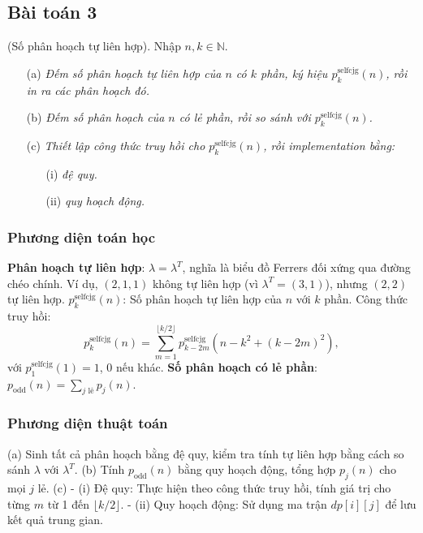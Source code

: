 \documentclass[a4paper,12pt]{article}
\begin{document}
\subsection{Bài toán 3} (Số phân hoạch tự liên hợp). Nhập $n, k \in \mathbb{N}$.
\begin{itemize}
    \item[(a)] \textit{Đếm số phân hoạch tự liên hợp của $n$ có $k$ phần, ký hiệu $p_k^{\text{selfcjg}}(n)$, rồi in ra các phân hoạch đó.}
    \item[(b)] \textit{Đếm số phân hoạch của $n$ có lẻ phần, rồi so sánh với $p_k^{\text{selfcjg}}(n)$.}
    \item[(c)] \textit{Thiết lập công thức truy hồi cho $p_k^{\text{selfcjg}}(n)$, rồi implementation bằng:}
    \begin{itemize}
        \item[(i)] \textit{đệ quy.}
        \item[(ii)] \textit{quy hoạch động.}
    \end{itemize}
\end{itemize}

\subsubsection{Phương diện toán học}
\textbf{Phân hoạch tự liên hợp}: \( \lambda = \lambda^T \), nghĩa là biểu đồ Ferrers đối xứng qua đường chéo chính. Ví dụ, \( (2, 1, 1) \) không tự liên hợp (vì \( \lambda^T = (3, 1) \)), nhưng \( (2, 2) \) tự liên hợp.
\textbf{\( p_k^{\text{selfcjg}}(n) \)}: Số phân hoạch tự liên hợp của \( n \) với \( k \) phần. Công thức truy hồi:
  \[
  p_k^{\text{selfcjg}}(n) = \sum_{m=1}^{\lfloor k/2 \rfloor} p_{k-2m}^{\text{selfcjg}}(n - k^2 + (k-2m)^2),
  \]
  với \( p_1^{\text{selfcjg}}(1) = 1 \), 0 nếu khác.
\textbf{Số phân hoạch có lẻ phần}: \( p_{\text{odd}}(n) = \sum_{j \text{ lẻ}} p_j(n) \).

\subsubsection{Phương diện thuật toán}
(a) Sinh tất cả phân hoạch bằng đệ quy, kiểm tra tính tự liên hợp bằng cách so sánh \( \lambda \) với \( \lambda^T \).
(b) Tính \( p_{\text{odd}}(n) \) bằng quy hoạch động, tổng hợp \( p_j(n) \) cho mọi \( j \) lẻ.
(c) 
  - (i) Đệ quy: Thực hiện theo công thức truy hồi, tính giá trị cho từng \( m \) từ 1 đến \( \lfloor k/2 \rfloor \).
  - (ii) Quy hoạch động: Sử dụng ma trận \( dp[i][j] \) để lưu kết quả trung gian.
\end{document}
